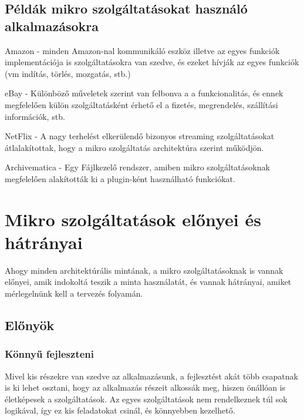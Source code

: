 \documentclass[11pt,magyar,a4paper,oneside,]{report}
\begin{document}
\section{Példák mikro szolgáltatásokat használó
alkalmazásokra}\label{puxe9lduxe1k-mikro-szolguxe1ltatuxe1sokat-hasznuxe1luxf3-alkalmazuxe1sokra}

Amazon - minden Amazon-nal kommunikáló eszköz illetve az egyes funkciók
implementációja is szolgáltatásokra van szedve, és ezeket hívják az
egyes funkciók (vm indítás, törlés, mozgatás, stb.)

eBay - Különböző műveletek szerint van felbonva a a funkcionalitás, és
ennek megfelelően külön szolgáltatásként érhető el a fizetés,
megrendelés, szállítási információk, stb.

NetFlix - A nagy terhelést elkerülendő bizonyos streaming
szolgáltatásokat átlalakítottak, hogy a mikro szolgáltatás architektúra
szerint működjön.

Archivematica\citep{archivematica} - Egy Fájlkezelő rendszer, amiben
mikro szolgáltatásoknak megfelelően alakították ki a plugin-ként
használható funkciókat.

\chapter{Mikro szolgáltatások előnyei és
hátrányai}\label{mikro-szolguxe1ltatuxe1sok-elux151nyei-uxe9s-huxe1truxe1nyai}

Ahogy minden architektúrális mintának, a mikro szolgáltatásoknak is
vannak előnyei, amik indokoltá teszik a minta használatát, és vannak
hátrányai, amiket mérlegelnünk kell a tervezés folyamán.

\section{Előnyök
\citep{microservices}}\label{elux151nyuxf6k-microservices}

\subsection{Könnyű fejleszteni}\label{kuxf6nnyux171-fejleszteni}

Mivel kis részekre van szedve az alkalmazásunk, a fejlesztést akát több
csapatnak is ki lehet osztani, hogy az alkalmazás részeit alkossák meg,
hiszen önállóan is életképesek a szolgáltatások. Az egyes szolgáltatások
nem rendelkeznek túl sok logikával, így ez kis feladatokat csinál, és
könnyebben kezelhető.
\end{document}
